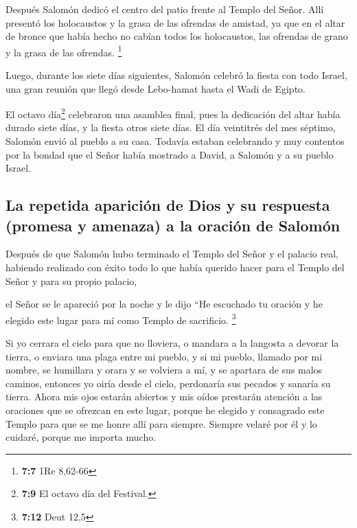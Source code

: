  Después Salomón dedicó el centro del patio frente al
Templo del Señor. Allí presentó los holocaustos y la grasa de las
ofrendas de amistad, ya que en el altar de bronce que había hecho no
cabían todos los holocaustos, las ofrendas de grano y la grasa de las
ofrendas. \footnote{\textbf{7:7} 1Re 8,62-66}

 Luego, durante los siete días siguientes, Salomón celebró
la fiesta con todo Israel, una gran reunión que llegó desde Lebo-hamat
hasta el Wadi de Egipto.

 El octavo día\footnote{\textbf{7:9} El octavo día del
  Festival.} celebraron una asamblea final, pues la dedicación del altar
había durado siete días, y la fiesta otros siete días. 
El día veintitrés del mes séptimo, Salomón envió al pueblo a su casa.
Todavía estaban celebrando y muy contentos por la bondad que el Señor
había mostrado a David, a Salomón y a su pueblo Israel.

\hypertarget{la-repetida-apariciuxf3n-de-dios-y-su-respuesta-promesa-y-amenaza-a-la-oraciuxf3n-de-salomuxf3n}{%
\subsection{La repetida aparición de Dios y su respuesta (promesa y
amenaza) a la oración de
Salomón}\label{la-repetida-apariciuxf3n-de-dios-y-su-respuesta-promesa-y-amenaza-a-la-oraciuxf3n-de-salomuxf3n}}

 Después de que Salomón hubo terminado el Templo del
Señor y el palacio real, habiendo realizado con éxito todo lo que había
querido hacer para el Templo del Señor y para su propio palacio,

 el Señor se le apareció por la noche y le dijo ``He
escuchado tu oración y he elegido este lugar para mí como Templo de
sacrificio. \footnote{\textbf{7:12} Deut 12,5}

 Si yo cerrara el cielo para que no lloviera, o mandara a
la langosta a devorar la tierra, o enviara una plaga entre mi pueblo,
 y si mi pueblo, llamado por mi nombre, se humillara y
orara y se volviera a mí, y se apartara de sus malos caminos, entonces
yo oiría desde el cielo, perdonaría sus pecados y sanaría su tierra.
 Ahora mis ojos estarán abiertos y mis oídos prestarán
atención a las oraciones que se ofrezcan en este lugar, 
porque he elegido y consagrado este Templo para que se me honre allí
para siempre. Siempre velaré por él y lo cuidaré, porque me importa
mucho.

